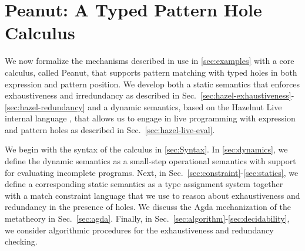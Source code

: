 \section{Peanut: A Typed Pattern Hole Calculus}
\label{sec:formalism}
We now formalize the mechanisms described in use in \autoref{sec:examples} with a core calculus, called Peanut, that supports pattern matching with typed holes in both expression and pattern position. We develop both a static semantics that enforces exhaustiveness and irredundancy as described in Sec.~\ref{sec:hazel-exhaustiveness}-\ref{sec:hazel-redundancy} and a dynamic semantics, based on the Hazelnut Live internal language \cite{DBLP:journals/pacmpl/OmarVCH19}, that allows us to engage in live programming with expression and pattern holes as described in Sec.~\ref{sec:hazel-live-eval}.


We begin with the syntax of the calculus in \autoref{sec:Syntax}.
In \autoref{sec:dynamics}, we define the dynamic semantics as a small-step operational semantics with support for evaluating incomplete programs.
Next, in Sec.~\ref{sec:constraint}-\ref{sec:statics}, we define a corresponding static semantics as a type assignment system together with a match constraint language that we use to reason about exhaustiveness and redundancy in the presence of
holes. We discuss the Agda mechanization of the metatheory in Sec.~\ref{sec:agda}. Finally, in Sec.~\ref{sec:algorithm}-\ref{sec:decidability}, we consider algorithmic procedures for the exhaustiveness and redundancy checking.





